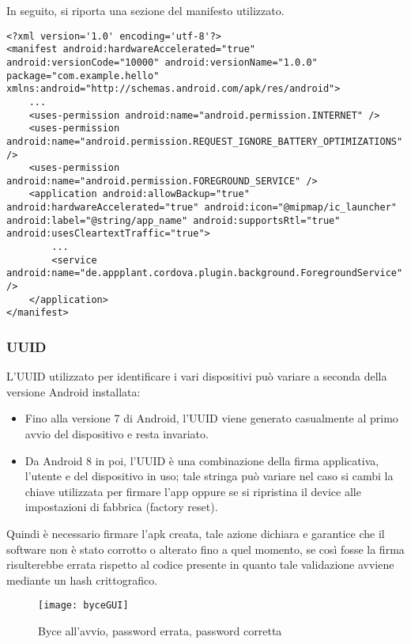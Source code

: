 \documentclass[target=bach]{thud}
\begin{document}
            In seguito, si riporta una sezione del manifesto utilizzato.
\begin{lstlisting}
<?xml version='1.0' encoding='utf-8'?>
<manifest android:hardwareAccelerated="true" android:versionCode="10000" android:versionName="1.0.0" package="com.example.hello" xmlns:android="http://schemas.android.com/apk/res/android">
    ...
    <uses-permission android:name="android.permission.INTERNET" />
    <uses-permission android:name="android.permission.REQUEST_IGNORE_BATTERY_OPTIMIZATIONS" />
    <uses-permission android:name="android.permission.FOREGROUND_SERVICE" />
    <application android:allowBackup="true" android:hardwareAccelerated="true" android:icon="@mipmap/ic_launcher" android:label="@string/app_name" android:supportsRtl="true" android:usesCleartextTraffic="true">
        ...
        <service android:name="de.appplant.cordova.plugin.background.ForegroundService" />
    </application>
</manifest>

\end{lstlisting}

        \subsubsection{UUID}
            L'UUID utilizzato per identificare i vari dispositivi può variare a seconda della versione Android installata:
            \begin{itemize}
                \setlength{\itemsep}{1pt}
                \item Fino alla versione 7 di Android, l'UUID viene generato casualmente al primo avvio del dispositivo e resta invariato.
                \item Da Android 8 in poi, l'UUID è una combinazione della firma applicativa, l'utente e del dispositivo in uso; tale stringa può variare nel caso si cambi la chiave utilizzata per firmare l'app oppure se si ripristina il device alle impostazioni di fabbrica (factory reset).
            \end{itemize}
            Quindi è necessario firmare l'apk creata, tale azione dichiara e garantice che il software non è stato corrotto o alterato fino a quel momento, se così fosse la firma risulterebbe errata rispetto al codice presente in quanto tale validazione avviene mediante un hash crittografico.\\


        \graphicspath{ {./img/} }
        \begin{figure}[h]
            \centering
            \texttt{[image: byceGUI]}
            \caption{Byce all'avvio, password errata, password corretta}
            \label{fig:usecase}
        \end{figure}
\end{document}
